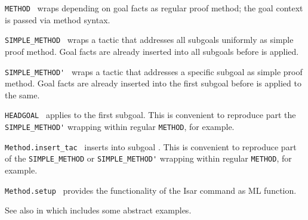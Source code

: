 \begin{isabellebody}
\begin{isamarkuptext}
\begin{description}
  \item \verb|METHOD|~ wraps  depending on goal facts as regular proof method; the goal
  context is passed via method syntax.

  \item \verb|SIMPLE_METHOD|~ wraps a tactic that
  addresses all subgoals uniformly as simple proof method.  Goal facts
  are already inserted into all subgoals before  is
  applied.

  \item \verb|SIMPLE_METHOD'|~ wraps a tactic that
  addresses a specific subgoal as simple proof method.  Goal facts are
  already inserted into the first subgoal before  is
  applied to the same.

  \item \verb|HEADGOAL|~ applies  to
  the first subgoal.  This is convenient to reproduce part the \verb|SIMPLE_METHOD'| wrapping within regular \verb|METHOD|, for example.

  \item \verb|Method.insert_tac|~ inserts  into subgoal .  This is convenient to reproduce
  part of the \verb|SIMPLE_METHOD| or \verb|SIMPLE_METHOD'| wrapping
  within regular \verb|METHOD|, for example.

  \item \verb|Method.setup|~ provides
  the functionality of the Isar command \hyperlink{command.method-setup}{\mbox{}} as ML
  function.

  \end{description}%
\end{isamarkuptext}%
\isamarkuptrue%
%
\endisatagmlref
{\isafoldmlref}%
%
\isadelimmlref
%
\endisadelimmlref
%
\isadelimmlex
%
\endisadelimmlex
%
\isatagmlex
%
\begin{isamarkuptext}%
See also \hyperlink{command.method-setup}{\mbox{}} in
  \cite{isabelle-isar-ref} which includes some abstract examples.


\end{isamarkuptext}
\end{isabellebody}
